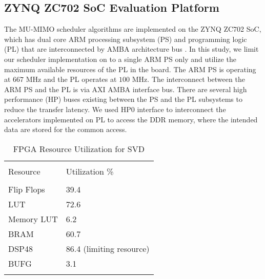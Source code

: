 \documentclass[conference,letterpaper,10pt]{./../../IEEE/IEEEtran}
\begin{document}
\subsection{ZYNQ ZC702 SoC Evaluation Platform}
The MU-MIMO scheduler algorithms are implemented on the ZYNQ ZC702 SoC, which has dual core ARM processing subsystem (PS) and programming logic (PL) that are interconnected by \ac{AMBA} architecture bus \cite{zynq}. In this study, we limit our scheduler implementation on to a single ARM PS only and utilize the maximum available resources of the PL in the board. The ARM PS is operating at $667$ MHz and the PL operates at $100$ MHz. The interconnect between the ARM PS and the PL is via \ac{AXI} \ac{AMBA} interface bus. There are several high performance (HP) buses existing between the PS and the PL subsystems to reduce the transfer latency. We used HP$0$ interface to interconnect the accelerators implemented on PL to access the DDR memory, where the intended data are stored for the common access.
\begin{table} \caption{FPGA Resource Utilization for SVD} \begin{center} \small \begin{tabular}{l l} \hline \\
Resource 	&  	Utilization \% \\ 
\hline \\
Flip Flops 	& 	39.4 \\
LUT 		& 	72.6 \\
Memory LUT 	& 	6.2 \\
BRAM 		& 	60.7 \\
DSP48 		& 	86.4 (limiting resource)\\
BUFG 		& 	3.1 \\ 
\hline \vspace{-0.3in}
\end{tabular} \label{tbl-utilization} \end{center} \end{table}
\end{document}
